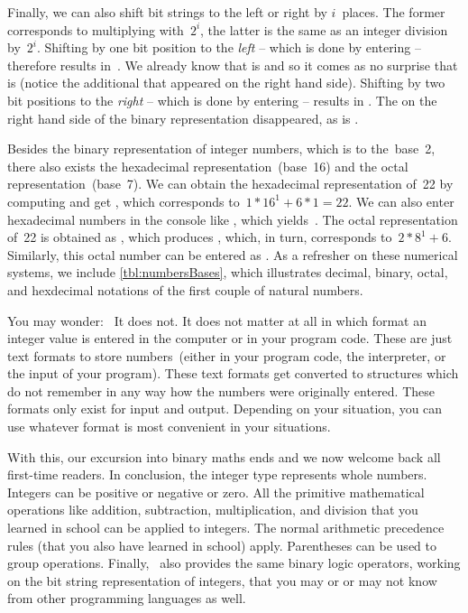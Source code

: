 Finally, we can also shift bit strings to the left or right by $i$~places.
The former corresponds to multiplying with~$2^i$, the latter is the same as an integer division by~$2^i$.
Shifting  by one bit position to the \emph{left} -- which is done by entering \pythonIdx{<\strut<} -- therefore results in~.
We already know that  is  and so it comes as no surprise that  is  (notice the additional  that appeared on the right hand side).
Shifting  by two bit positions to the \emph{right} -- which is done by entering \pythonIdx{>\strut>} -- results in .
The  on the right hand side of the binary representation disappeared, as  is .


Besides the binary representation of integer numbers, which is to the~base~2, there also exists the hexadecimal representation~(base~16) and the octal representation~(base~7).
We can obtain the hexadecimal representation of~22 by computing  and get , which corresponds to~$1*16^1+6*1=22$.
We can also enter hexadecimal numbers in the console like , which yields~.
The octal representation of~22 is obtained as , which produces , which, in turn, corresponds to~$2*8^1+6$.
Similarly, this octal number can be entered as .
As a refresher on these numerical systems, we include \cref{tbl:numbersBases}, which illustrates decimal, binary, octal, and hexdecimal notations of the first couple of natural numbers.

You may wonder:~
It does not.
It does not matter at all in which format an integer value is entered in the computer or in your program code.
These are just text formats to store numbers~(either in your program code, the interpreter, or the input of your program).
These text formats get converted to  structures which do not remember in any way how the numbers were originally entered.
These formats only exist for input and output.
Depending on your situation, you can use whatever format is most convenient in your situations.

With this, our excursion into binary maths ends and we now welcome back all first-time readers.%
%
\endhsection%
%
%
In conclusion, the integer type  represents whole numbers.
Integers can be positive or negative or zero.
All the primitive mathematical operations like addition, subtraction, multiplication, and division that you learned in school can be applied to integers.
The normal arithmetic precedence rules (that you also have learned in school) apply.
Parentheses can be used to group operations.
Finally, \python\ also provides the same binary logic operators, working on the bit string representation of integers, that you may or or may not know from other programming languages as well.
\endhsection%
\FloatBarrier%
\endhsection%
%
